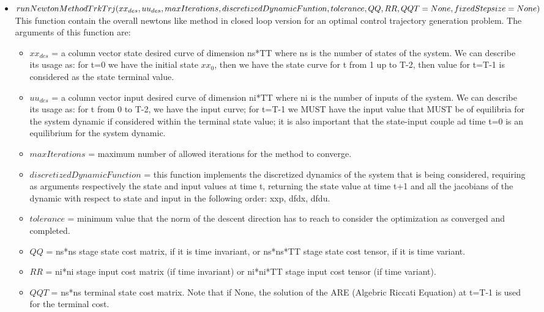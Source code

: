 \documentclass[a4paper,11pt,oneside]{book}
\begin{document}
\begin{itemize}
    \item $runNewtonMethodTrkTrj(xx_{des}, uu_{des}, maxIterations, \\ discretizedDynamicFuntion,tolerance, QQ, RR, QQT=None,\\ fixedStepsize=None)$ \\
    This function contain the overall newton\textquotesingle s like method in closed loop version for an optimal control trajectory generation problem. The arguments of this function are:
    \begin{itemize}
        \item $xx_{des}$ = a column vector state desired curve of dimension ns*TT where ns is the number of states of the system. We can describe its usage as: for t=0 we have the initial state $xx_0$, then we have the state curve for t from 1 up to T-2, then value for t=T-1 is considered as the state terminal value.
        \item $uu_{des}$ = a column vector input desired curve of dimension ni*TT where ni is the number of inputs of the system. We can describe its usage as: for t from 0 to T-2, we have the input curve;
        for t=T-1 we MUST have the input value that MUST be of equilibria for the system dynamic if considered within the terminal state value; it is also important that the state-input couple ad time t=0 is an equilibrium for the system dynamic.
        \item $maxIterations$ = maximum number of allowed iterations for the method to converge.
        \item $discretizedDynamicFunction$ =
        this function implements the discretized dynamics of the system that is being considered, requiring as arguments respectively the state and input values at time t, returning the state value at time t+1 and all the jacobians of the dynamic with respect to state and input in the following order: xxp, dfdx, dfdu.
        \item $tolerance$ = minimum value that the norm of the descent direction has to reach to consider the optimization as converged and completed.
        \item $QQ$ = ns*ns stage state cost matrix, if it is time invariant, or ns*ns*TT stage state cost tensor, if it is time variant.
        \item $RR$ = ni*ni stage input cost matrix (if time invariant) or ni*ni*TT stage input cost tensor (if time variant).
        \item $QQT$ = ns*ns terminal state cost matrix. Note that if None, the solution of the ARE (Algebric Riccati Equation) at t=T-1 is used for the terminal cost.

\end{itemize}
\end{itemize}
\end{document}
